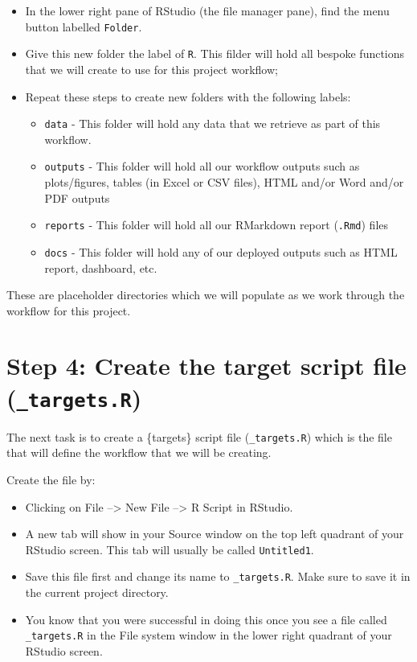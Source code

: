 \documentclass[
  12pt,
]{book}
\begin{document}
\begin{itemize}
\item
  In the lower right pane of RStudio (the file manager pane), find the menu button labelled \texttt{Folder}.
\item
  Give this new folder the label of \texttt{R}. This filder will hold all bespoke functions that we will create to use for this project workflow;
\item
  Repeat these steps to create new folders with the following labels:

  \begin{itemize}
  \item
    \texttt{data} - This folder will hold any data that we retrieve as part of this workflow.
  \item
    \texttt{outputs} - This folder will hold all our workflow outputs such as plots/figures, tables (in Excel or CSV files), HTML and/or Word and/or PDF outputs
  \item
    \texttt{reports} - This folder will hold all our RMarkdown report (\texttt{.Rmd}) files
  \item
    \texttt{docs} - This folder will hold any of our deployed outputs such as HTML report, dashboard, etc.
  \end{itemize}
\end{itemize}

These are placeholder directories which we will populate as we work through the workflow for this project.

\hypertarget{step-4-create-the-target-script-file-_targets.r}{%
\section{\texorpdfstring{Step 4: Create the target script file (\texttt{\_targets.R})}{Step 4: Create the target script file (\_targets.R)}}\label{step-4-create-the-target-script-file-_targets.r}}

The next task is to create a \{targets\} script file (\texttt{\_targets.R}) which is the file that will define the workflow that we will be creating.

Create the file by:

\begin{itemize}
\item
  Clicking on File --\textgreater{} New File --\textgreater{} R Script in RStudio.
\item
  A new tab will show in your Source window on the top left quadrant of your RStudio screen. This tab will usually be called \texttt{Untitled1}.
\item
  Save this file first and change its name to \texttt{\_targets.R}. Make sure to save it in the current project directory.
\item
  You know that you were successful in doing this once you see a file called \texttt{\_targets.R} in the File system window in the lower right quadrant of your RStudio screen.
\end{itemize}
\end{document}
